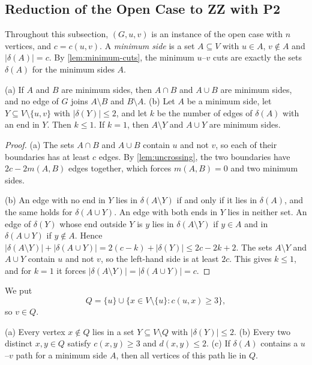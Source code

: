 \subsection{Reduction of the Open Case to ZZ with P2}
\label{sec:zz-reduction}

Throughout this subsection, $(G, u, v)$ is an instance of the open case with $n$ vertices, and $c = c(u, v)$.
A \emph{minimum side} is a set $A \subseteq V$ with $u \in A$, $v \notin A$ and $|\delta(A)| = c$.
By \cref{lem:minimum-cuts}, the minimum $u$--$v$ cuts are exactly the sets $\delta(A)$ for the minimum sides $A$.

\begin{lemma}
\label{lem:zz-sides}
(a) If $A$ and $B$ are minimum sides, then $A \cap B$ and $A \cup B$ are minimum sides, and no edge of $G$ joins $A \setminus B$ and $B \setminus A$.
(b) Let $A$ be a minimum side, let $Y \subseteq V \setminus \{u, v\}$ with $|\delta(Y)| \leq 2$, and let $k$ be the number of edges of $\delta(A)$ with an end in $Y$.
Then $k \leq 1$.
If $k = 1$, then $A \setminus Y$ and $A \cup Y$ are minimum sides.
\end{lemma}

\begin{proof}
(a) The sets $A \cap B$ and $A \cup B$ contain $u$ and not $v$, so each of their boundaries has at least $c$ edges.
By \cref{lem:uncrossing}, the two boundaries have $2c - 2m(A, B)$ edges together, which forces $m(A, B) = 0$ and two minimum sides.

(b) An edge with no end in $Y$ lies in $\delta(A \setminus Y)$ if and only if it lies in $\delta(A)$, and the same holds for $\delta(A \cup Y)$.
An edge with both ends in $Y$ lies in neither set.
An edge of $\delta(Y)$ whose end outside $Y$ is $y$ lies in $\delta(A \setminus Y)$ if $y \in A$ and in $\delta(A \cup Y)$ if $y \notin A$.
Hence $|\delta(A \setminus Y)| + |\delta(A \cup Y)| = 2(c - k) + |\delta(Y)| \leq 2c - 2k + 2$.
The sets $A \setminus Y$ and $A \cup Y$ contain $u$ and not $v$, so the left-hand side is at least $2c$.
This gives $k \leq 1$, and for $k = 1$ it forces $|\delta(A \setminus Y)| = |\delta(A \cup Y)| = c$.
\end{proof}

We put
\[
Q = \{u\} \cup \{x \in V \setminus \{u\} : c(u, x) \geq 3\},
\]
so $v \in Q$.

\begin{lemma}
\label{lem:zz-q}
(a) Every vertex $x \notin Q$ lies in a set $Y \subseteq V \setminus Q$ with $|\delta(Y)| \leq 2$.
(b) Every two distinct $x, y \in Q$ satisfy $c(x, y) \geq 3$ and $d(x, y) \leq 2$.
(c) If $\delta(A)$ contains a $u$--$v$ path for a minimum side $A$, then all vertices of this path lie in $Q$.
\end{lemma}

